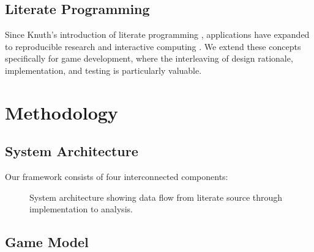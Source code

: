 \documentclass[sigconf]{acmart}
\begin{document}
\subsection{Literate Programming}

Since Knuth's introduction of literate programming \cite{knuth1984literate}, applications have expanded to reproducible research \cite{schulte2012multi} and interactive computing \cite{perez2007ipython}. We extend these concepts specifically for game development, where the interleaving of design rationale, implementation, and testing is particularly valuable.

\section{Methodology}

\subsection{System Architecture}

Our framework consists of four interconnected components:

\begin{figure}[h]
\centering
{}
\caption{System architecture showing data flow from literate source through implementation to analysis.}
\label{fig:architecture}
\end{figure}

\subsection{Game Model}
\end{document}
